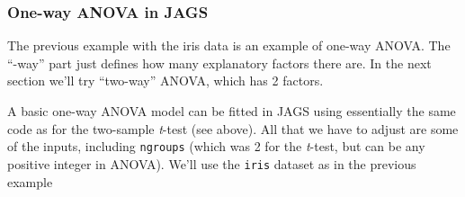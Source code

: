\documentclass[
  13,
  letterpaper,
]{report}
\begin{document}
\subsubsection{One-way ANOVA in JAGS}\label{one-way-anova-in-jags}

The previous example with the iris data is an example of one-way ANOVA.
The ``-way'' part just defines how many explanatory factors there are.
In the next section we'll try ``two-way'' ANOVA, which has 2 factors.

A basic one-way ANOVA model can be fitted in JAGS using essentially the
same code as for the two-sample \emph{t}-test (see above). All that we
have to adjust are some of the inputs, including \texttt{ngroups} (which
was 2 for the \emph{t}-test, but can be any positive integer in ANOVA).
We'll use the \texttt{iris} dataset as in the previous example
\end{document}
